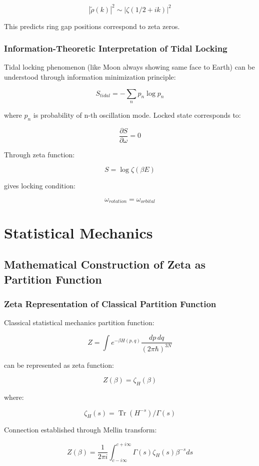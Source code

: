 \documentclass[12pt,a4paper]{article}
\DeclareMathOperator{\Tr}{Tr}
\begin{document}
$$|\tilde{\rho}(k)|^2 \sim |\zeta(1/2 + ik)|^2$$

This predicts ring gap positions correspond to zeta zeros.

\subsubsection{Information-Theoretic Interpretation of Tidal Locking}

Tidal locking phenomenon (like Moon always showing same face to Earth) can be understood through information minimization principle:

$$S_{tidal} = -\sum_n p_n \log p_n$$

where $p_n$ is probability of n-th oscillation mode. Locked state corresponds to:

$$\frac{\partial S}{\partial \omega} = 0$$

Through zeta function:

$$S = \log \zeta(\beta E)$$

gives locking condition:

$$\omega_{rotation} = \omega_{orbital}$$

\section{Statistical Mechanics}

\subsection{Mathematical Construction of Zeta as Partition Function}

\subsubsection{Zeta Representation of Classical Partition Function}

Classical statistical mechanics partition function:

$$Z = \int e^{-\beta H(p,q)} \frac{dp \, dq}{(2\pi\hbar)^{3N}}$$

can be represented as zeta function:

$$Z(\beta) = \zeta_{H}(\beta)$$

where:

$$\zeta_{H}(s) = \Tr(H^{-s})/\Gamma(s)$$

Connection established through Mellin transform:

$$Z(\beta) = \frac{1}{2\pi i} \int_{c-i\infty}^{c+i\infty} \Gamma(s) \zeta_H(s) \beta^{-s} ds$$
\end{document}
